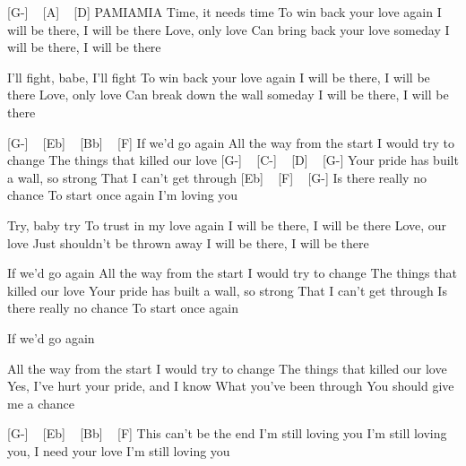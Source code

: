 
[G-] ~ [A] ~ [D]
PAMIAMIA
Time, it needs time
To win back your love again
I will be there, I will be there
Love, only love
Can bring back your love someday
I will be there, I will be there

I'll fight, babe, I'll fight
To win back your love again
I will be there, I will be there
Love, only love
Can break down the wall someday
I will be there, I will be there

[G-] ~ [Eb] ~ [Bb] ~ [F]
If we'd go again
All the way from the start
I would try to change
The things that killed our love
[G-] ~ [C-] ~ [D] ~ [G-]
Your pride has built a wall, so strong
That I can't get through
[Eb] ~ [F] ~ [G-]
Is there really no chance
To start once again
I'm loving you


Try, baby try
To trust in my love again
I will be there, I will be there
Love, our love
Just shouldn't be thrown away
I will be there, I will be there

If we'd go again
All the way from the start
I would try to change
The things that killed our love
Your pride has built a wall, so strong
That I can't get through
Is there really no chance
To start once again

If we'd go again

All the way from the start
I would try to change
The things that killed our love
Yes, I've hurt your pride, and I know
What you've been through
You should give me a chance

[G-] ~ [Eb] ~ [Bb] ~ [F]
This can't be the end
I'm still loving you
I'm still loving you, I need your love
I'm still loving you 
